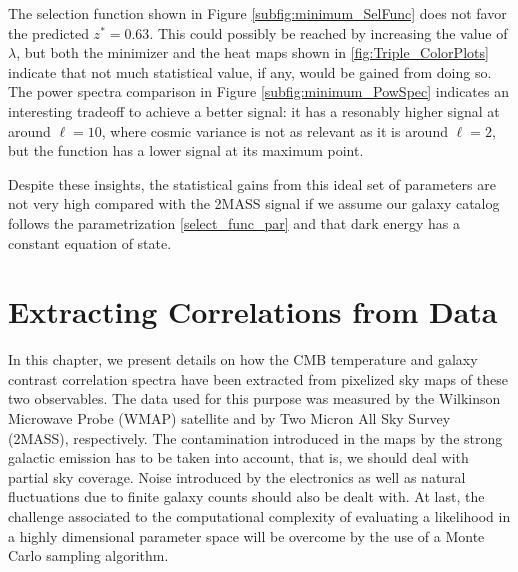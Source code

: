 \documentclass[openany,a4paper,12pt,oneside]{book}
\begin{document}
\begin{spacing}{1.5}
The selection function shown in Figure \ref{subfig:minimum_SelFunc} does not favor the predicted $z^*=0.63$. This could possibly be reached by increasing the value of $\lambda$, but both the minimizer and the heat maps shown in \ref{fig:Triple_ColorPlots} indicate that not much statistical value, if any, would be gained from doing so. The power spectra comparison in Figure \ref{subfig:minimum_PowSpec} indicates an interesting tradeoff to achieve a better signal: it has a resonably higher signal at around $\ell=10$, where cosmic variance is not as relevant as it is around $\ell=2$, but the function has a lower signal at its maximum point.

Despite these insights, the statistical gains from this ideal set of parameters are not very high compared with the 2MASS signal if we assume our galaxy catalog follows the parametrization \eqref{select_func_par} and that dark energy has a constant equation of state. 

\chapter{Extracting Correlations from Data} \label{chapter:extracting_correlations_from_data}


In this chapter, we present details on how the CMB temperature and galaxy contrast correlation spectra have been extracted from pixelized sky maps of these two observables. The data used for this purpose was measured by the Wilkinson Microwave Probe (WMAP) satellite and by Two Micron All Sky Survey (2MASS), respectively. The contamination introduced in the maps by the strong galactic emission has to be taken into account, that is, we should deal with partial sky coverage. Noise introduced by the electronics as well as natural fluctuations due to finite galaxy counts should also be dealt with. At last, the challenge associated to the computational complexity of evaluating a likelihood in a highly dimensional parameter space will be overcome by the use of a Monte Carlo sampling algorithm.





\end{spacing}
\end{document}
